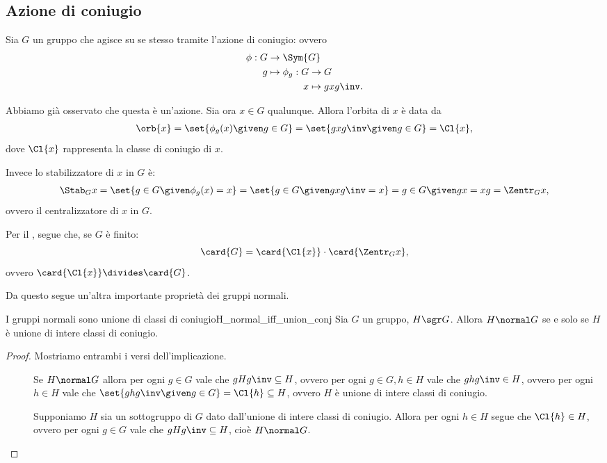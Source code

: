 \subsection{Azione di coniugio}
Sia $G$ un gruppo che agisce su se stesso tramite l'azione di coniugio: ovvero \begin{align*}
    \phi : G &\to \Sym{G}\\
           g &\mapsto 
    \begin{aligned}[t]
        \phi_g : G &\to G\\
                 x &\mapsto gxg\inv.
    \end{aligned}
\end{align*}

Abbiamo già osservato che questa è un'azione. Sia ora $x \in G$ qualunque. Allora l'orbita di $x$ è data da
\begin{align*}
    \orb{x} 
    = \set{\phi_g(x) \given g \in G}
    = \set{gxg\inv \given g \in G}
    = \Cl{x},
\end{align*}
dove $\Cl{x}$ rappresenta la classe di coniugio di $x$.

Invece lo stabilizzatore di $x$ in $G$ è:
\begin{align*}
    \Stab_{G}{x} 
    = \set{g \in G \given \phi_g(x) = x}
    = \set{g \in G \given gxg\inv = x}
    = {g \in G \given gx = xg}
    = \Zentr_{G}{x},
\end{align*}
ovvero il centralizzatore di $x$ in $G$.

Per il , segue che, se $G$ è finito: \[
    \card{G} = \card{\Cl{x}} \cdot \card{\Zentr_{G}{x}},  
\] ovvero $\card{\Cl{x}} \divides \card{G}$.

Da questo segue un'altra importante proprietà dei gruppi normali.
\begin{proposition}{I gruppi normali sono unione di classi di coniugio}{H_normal_iff_union_conj}
    Sia $G$ un gruppo, $H \sgr G$. Allora $H \normal G$ se e solo se $H$ è unione di intere classi di coniugio.
\end{proposition}
\begin{proof}
    Mostriamo entrambi i versi dell'implicazione.
    \begin{description}
        \item[\boximpl] Se $H \normal G$ allora per ogni $g \in G$ vale che $gHg\inv \subseteq H$, ovvero per ogni $g \in G, h \in H$ vale che $ghg\inv \in H$, ovvero per ogni $h \in H$ vale che $\set{ghg\inv \given g \in G} = \Cl{h} \subseteq H$, ovvero $H$ è unione di intere classi di coniugio.
        \item[\boximplby] Supponiamo $H$ sia un sottogruppo di $G$ dato dall'unione di intere classi di coniugio. Allora per ogni $h \in H$ segue che $\Cl{h} \in H$, ovvero per ogni $g \in G$ vale che $gHg\inv \subseteq H$, cioè $H \normal G$. \qedhere 
    \end{description}
\end{proof}

